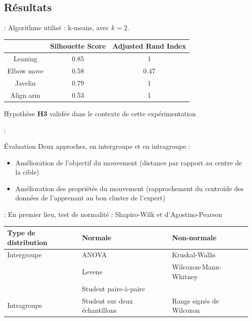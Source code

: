 \documentclass[svgnames]{beamer}
\begin{document}
	\subsection{Résultats}
	\begin{frame}{\secname : \subsecname}
	Algorithme utilisé : k-means, avec $k=2$.
	
	\begin{table}[h]
		\centering
		\begin{tabular}{c|c|c}
			& Silhouette Score & Adjusted Rand Index\\\hline
			Leaning & 0.85 & 1\\
			Elbow move & 0.58 & 0.47\\
			Javelin & 0.79 & 1\\
			Align arm & 0.53 & 1\\
		\end{tabular}
	\end{table}
		
		Hypothèse \textbf{H3} validée dans le contexte de cette expérimentation
		
	\end{frame}
	
	\begin{frame}{\secname : \subsecname}
		\begin{block}{Évaluation}
			Deux approches, en intergroupe et en intragroupe :
			\begin{itemize}[label=$\bullet$]
				\item Amélioration de l'objectif du mouvement (distance par rapport au centre de la cible)
				\item Amélioration des propriétés du mouvement (rapprochement du centroïde des données de l'apprenant au bon cluster de l'expert)
			\end{itemize}
		\end{block}
	\end{frame}
	
	\begin{frame}{\secname : \subsecname}
		En premier lieu, test de normalité : Shapiro-Wilk et d'Agostino-Pearson
		\begin{table}[]
			\begin{adjustbox}{max width=\textwidth}
			\begin{tabular}{l|l|l}
				Type de distribution & Normale & Non-normale \\\hline
				Intergroupe & ANOVA & Kruskal-Wallis \\
 				& Levene & Wilcoxon-Mann-Whitney \\
 				& Student paire-à-paire &  \\\hline
				Intragroupe & Student sur deux échantillons & Rangs signés de Wilcoxon
			\end{tabular}
			\end{adjustbox}
		\end{table}
	\end{frame}
	
\end{document}
